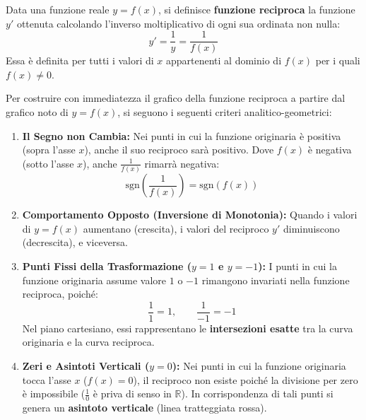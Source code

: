 \documentclass[11pt,a4paper,oneside]{report}
\begin{document}
\begin{definizione}
Data una funzione reale $y = f(x)$, si definisce \textbf{funzione reciproca} la funzione $y'$ ottenuta calcolando l'inverso moltiplicativo di ogni sua ordinata non nulla:
\begin{equation}
    y' = \frac{1}{y} = \frac{1}{f(x)}
\end{equation}
Essa \`e definita per tutti i valori di $x$ appartenenti al dominio di $f(x)$ per i quali $f(x) \neq 0$.
\end{definizione}

\begin{metodo}
Per costruire con immediatezza il grafico della funzione reciproca a partire dal grafico noto di $y = f(x)$, si seguono i seguenti criteri analitico-geometrici:
\begin{enumerate}[leftmargin=2em]
    \item \textbf{Il Segno non Cambia:} Nei punti in cui la funzione originaria \`e positiva (sopra l'asse $x$), anche il suo reciproco sar\`a positivo. Dove $f(x)$ \`e negativa (sotto l'asse $x$), anche $\frac{1}{f(x)}$ rimarr\`a negativa:
    \begin{equation}
        \mathrm{sgn}\left(\frac{1}{f(x)}\right) = \mathrm{sgn}(f(x))
    \end{equation}
    
    \item \textbf{Comportamento Opposto (Inversione di Monotonia):} Quando i valori di $y = f(x)$ aumentano (crescita), i valori del reciproco $y'$ diminuiscono (decrescita), e viceversa.
    
    \item \textbf{Punti Fissi della Trasformazione ($y = 1$ e $y = -1$):} I punti in cui la funzione originaria assume valore $1$ o $-1$ rimangono invariati nella funzione reciproca, poich\'e:
    \begin{equation}
        \frac{1}{1} = 1, \qquad \frac{1}{-1} = -1
    \end{equation}
    Nel piano cartesiano, essi rappresentano le \textbf{intersezioni esatte} tra la curva originaria e la curva reciproca.
    
    \item \textbf{Zeri e Asintoti Verticali ($y = 0$):} Nei punti in cui la funzione originaria tocca l'asse $x$ ($f(x) = 0$), il reciproco non esiste poich\'e la divisione per zero \`e impossibile ($\frac{1}{0}$ \`e priva di senso in $\mathbb{R}$). In corrispondenza di tali punti si genera un \textbf{asintoto verticale} (linea tratteggiata rossa).
    

\end{enumerate}
\end{metodo}
\end{document}
